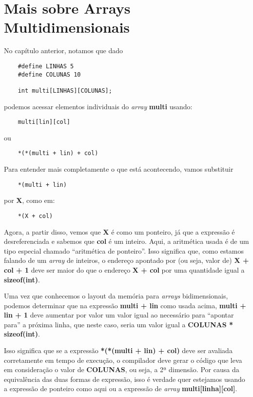 
\chapter{Mais sobre Arrays Multidimensionais}
No capítulo anterior, notamos que dado
\begin{lstlisting}
	#define LINHAS 5
	#define COLUNAS 10
	
	int multi[LINHAS][COLUNAS];
\end{lstlisting}
podemos acessar elementos individuais do \textit{array} \textbf{multi} usando:
\begin{lstlisting}
	multi[lin][col]
\end{lstlisting}
ou
\begin{lstlisting}
	*(*(multi + lin) + col)
\end{lstlisting}

Para entender mais completamente o que está acontecendo, vamos substituir
\begin{lstlisting}
	*(multi + lin)
\end{lstlisting}
por \textbf{X}, como em:
\begin{lstlisting}
	*(X + col)
\end{lstlisting}

Agora, a partir disso, vemos que \textbf{X} é como um ponteiro, já que a expressão é desreferenciada e sabemos que \textbf{col} é um inteiro. Aqui, a aritmética usada é de um tipo especial chamado ``aritmética de ponteiro''. Isso significa que, como estamos falando de um \textit{array} de inteiros, o endereço apontado por (ou seja, valor de) \textbf{X + col + 1} deve ser maior do que o endereço \textbf{X + col} por uma quantidade igual a \textbf{sizeof(int)}.

Uma vez que conhecemos o layout da memória para \textit{arrays} bidimensionais, podemos determinar que na expressão \textbf{multi + lin} como usada acima, \textbf{multi + lin + 1} deve aumentar por valor um valor igual ao necessário para ``apontar para'' a próxima linha, que neste caso, seria um valor igual a \textbf{COLUNAS * sizeof(int)}.

Isso significa que se a expressão \textbf{*(*(multi + lin) + col)} deve ser avaliada corretamente em tempo de execução, o compilador deve gerar o código que leva em consideração o valor de \textbf{COLUNAS}, ou seja, a 2ª dimensão. Por causa da equivalência das duas formas de expressão, isso é verdade quer estejamos usando a expressão de ponteiro como aqui ou a expressão de \textit{array} \textbf{multi[linha][col]}.

